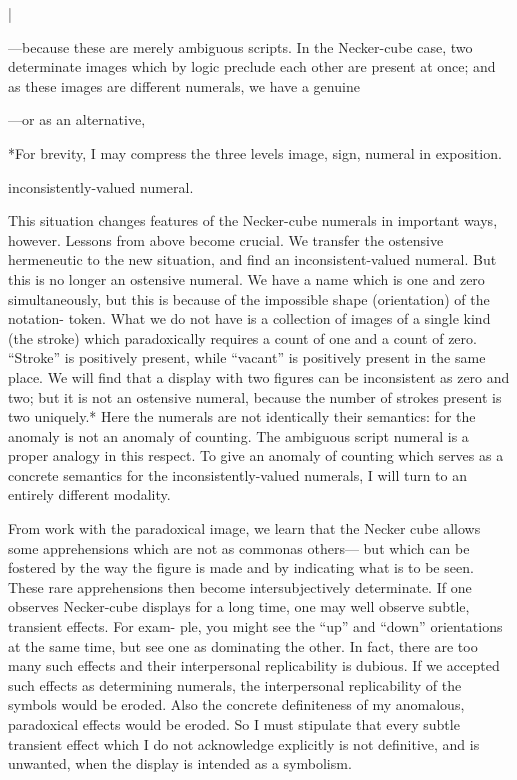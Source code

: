 | 


—because these are merely ambiguous scripts. In the Necker-cube case, 
two determinate images which by logic preclude each other are present 
at once; and as these images are different numerals, we have a genuine 


—or as an alternative, 


*For brevity, I may compress the three levels image, sign, numeral in 
exposition. 


inconsistently-valued numeral. 

This situation changes features of the Necker-cube numerals in 
important ways, however. Lessons from above become crucial. We 
transfer the ostensive hermeneutic to the new situation, and find an 
inconsistent-valued numeral. But this is no longer an ostensive 
numeral. We have a name which is one and zero simultaneously, but 
this is because of the impossible shape (orientation) of the notation- 
token. What we do not have is a collection of images of a single kind 
(the stroke) which paradoxically requires a count of one and a count of 
zero. “Stroke” is positively present, while “vacant” is positively present 
in the same place. We will find that a display with two figures can be 
inconsistent as zero and two; but it is not an ostensive numeral, because 
the number of strokes present is two uniquely.* Here the numerals are 
not identically their semantics: for the anomaly is not an anomaly of 
counting. The ambiguous script numeral is a proper analogy in this 
respect. To give an anomaly of counting which serves as a concrete 
semantics for the inconsistently-valued numerals, I will turn to an 
entirely different modality. 

From work with the paradoxical image, we learn that the Necker 
cube allows some apprehensions which are not as commonas others— 
but which can be fostered by the way the figure is made and by 
indicating what is to be seen. These rare apprehensions then become 
intersubjectively determinate. If one observes Necker-cube displays for 
a long time, one may well observe subtle, transient effects. For exam- 
ple, you might see the “up” and “down” orientations at the same time, 
but see one as dominating the other. In fact, there are too many such 
effects and their interpersonal replicability is dubious. If we accepted 
such effects as determining numerals, the interpersonal replicability of 
the symbols would be eroded. Also the concrete definiteness of my 
anomalous, paradoxical effects would be eroded. So I must stipulate 
that every subtle transient effect which I do not acknowledge explicitly 
is not definitive, and is unwanted, when the display is intended as a 
symbolism. 

